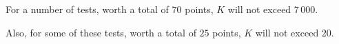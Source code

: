 For a number of tests, worth a total of $70$ points, $K$ will not exceed 7\,000.

Also, for some of these tests, worth a total of $25$ points, $K$ will not exceed $20$.